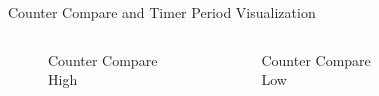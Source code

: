 \begin{frame}{Counter Compare and Timer Period Visualization}
	\begin{columns}
	  \begin{figure}
		\centering
		\caption{Counter Compare High}
	  \end{figure}
	  \begin{figure}
		\centering
		\caption{Counter Compare Low}
	  \end{figure}
	  \begin{figure}
		\centering

\end{figure}
\end{columns}
\end{frame}
